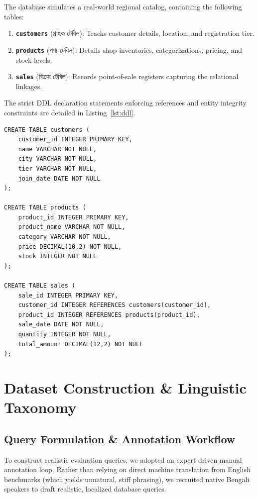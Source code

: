 \documentclass[11pt,a4paper]{article}
\begin{document}
The database simulates a real-world regional catalog, containing the following tables:
\begin{enumerate}
    \item \textbf{\texttt{customers}} (গ্রাহক টেবিল): Tracks customer details, location, and registration tier.
    \item \textbf{\texttt{products}} (পণ্য টেবিল): Details shop inventories, categorizations, pricing, and stock levels.
    \item \textbf{\texttt{sales}} (বিক্রয় টেবিল): Records point-of-sale registers capturing the relational linkages.
\end{enumerate}

The strict DDL declaration statements enforcing references and entity integrity constraints are detailed in Listing~\ref{lst:ddl}.

\begin{lstlisting}[caption={B-DAAB Relational DDL Declarations.}, label={lst:ddl}]
CREATE TABLE customers (
    customer_id INTEGER PRIMARY KEY,
    name VARCHAR NOT NULL,
    city VARCHAR NOT NULL,
    tier VARCHAR NOT NULL,
    join_date DATE NOT NULL
);

CREATE TABLE products (
    product_id INTEGER PRIMARY KEY,
    product_name VARCHAR NOT NULL,
    category VARCHAR NOT NULL,
    price DECIMAL(10,2) NOT NULL,
    stock INTEGER NOT NULL
);

CREATE TABLE sales (
    sale_id INTEGER PRIMARY KEY,
    customer_id INTEGER REFERENCES customers(customer_id),
    product_id INTEGER REFERENCES products(product_id),
    sale_date DATE NOT NULL,
    quantity INTEGER NOT NULL,
    total_amount DECIMAL(12,2) NOT NULL
);
\end{lstlisting}

\section{Dataset Construction & Linguistic Taxonomy}
\subsection{Query Formulation & Annotation Workflow}
To construct realistic evaluation queries, we adopted an expert-driven manual annotation loop. Rather than relying on direct machine translation from English benchmarks (which yields unnatural, stiff phrasing), we recruited native Bengali speakers to draft realistic, localized database queries. 
\end{document}
